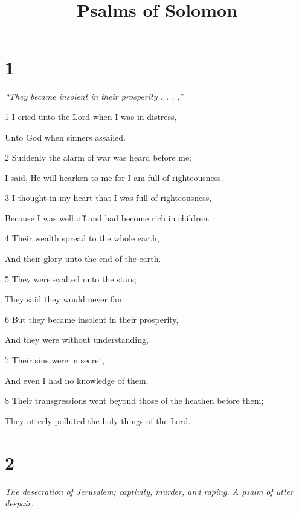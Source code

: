 

\title{Psalms of Solomon}

\chapter{1}

\par \textit{“They became insolent in their prosperity . . . .”}

\par 1 I cried unto the Lord when I was in distress,
\par  Unto God when sinners assailed.
\par 2 Suddenly the alarm of war was heard before me;
\par  I said, He will hearken to me for I am full of righteousness.
\par 3 I thought in my heart that I was full of righteousness,
\par  Because I was well off and had become rich in children.
\par 4 Their wealth spread to the whole earth,
\par  And their glory unto the end of the earth.
\par 5 They were exalted unto the stars;
\par  They said they would never fan.
\par 6 But they became insolent in their prosperity,
\par  And they were without understanding,
\par 7 Their sins were in secret,
\par  And even I had no knowledge of them.
\par 8 Their transgressions went beyond those of the heathen before them;
\par  They utterly polluted the holy things of the Lord.

\chapter{2}

\par \textit{The desecration of Jerusalem; captivity, murder, and raping. A psalm of utter despair.}

